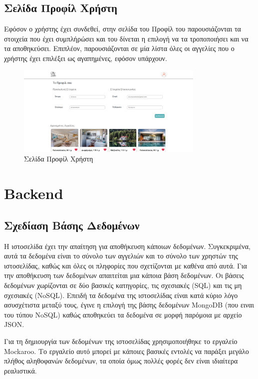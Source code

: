 \documentclass[manuscript,screen,review, language=greek, language=english]{acmart}
\begin{document}
\subsection{Σελίδα Προφίλ Χρήστη}
	Εφόσον ο χρήστης έχει συνδεθεί, στην σελίδα του Προφίλ του παρουσιάζονται τα στοιχεία
	που έχει συμπλήρώσει και του δίνεται η επιλογή να τα τροποποιήσει και να τα
	αποθηκεύσει. Επιπλέον, παρουσιάζονται σε μία λίστα όλες οι αγγελίες που ο χρήστης
	έχει επιλέξει ως αγαπημένες, εφόσον υπάρχουν.

	\begin{figure}[H]
		   \includegraphics[width=0.8\textwidth]{profile_page.png}
		   \caption{Σελίδα Προφίλ Χρήστη}
		   \label{fig:profile}
	\end{figure}


\section{Backend}
\subsection{Σχεδίαση Βάσης Δεδομένων}
	Η ιστοσελίδα έχει την απαίτηση για αποθήκευση κάποιων δεδομένων. Συγκεκριμένα, αυτά
	τα δεδομένα είναι το σύνολο των αγγελιών και το σύνολο των χρηστών της ιστοσελίδας,
	καθώς και όλες οι πληφορίες που σχετίζονται με καθένα από αυτά. Για την αποθήκευση
	των δεδομένων απαιτείται μια κάποια βάση δεδομένων. Οι βάσεις δεδομένων χωρίζονται σε
	δύο βασικές κατηγορίες, τις σχεσιακές (SQL) και τις μη σχεσιακές (NoSQL). Επειδή τα
	δεδομένα της ιστοσελίδας είναι κατά κύριο λόγο ασυσχέτιστα μεταξύ τους, έγινε η
	επιλογή της βάσης δεδομένων MongoDB (που ειναι του τύπου NoSQL) καθώς αποθηκεύει
	τα δεδομένα σε μορφή παρόμοια με αρχείο JSON.

	Για τη δημιουργία των δεδομένων της ιστοσελίδας χρησιμοποιήθηκε το εργαλείο Mockaroo.
	Το εργαλείο αυτό μπορεί με κάποιες βασικές εντολές να παράξει μεγάλο πλήθος
	αληθοφανών δεδομένων, τα οποία όμως πολλές φορές δεν είναι ιδιαίτερα ρεαλιστικά.
\end{document}
